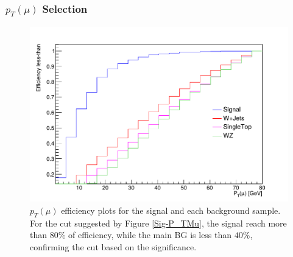 \documentclass{beamer}
\begin{document}
\begin{frame}
\frametitle{$p_T(\mu)$ Selection}
\begin{figure}[!h]
	
	\centering
	\includegraphics[scale=0.4]{pictures/Selection/P_TMu/Eff-P_TMu}
	\caption{{\scriptsize$p_T(\mu)$ efficiency plots for the signal and each background sample. For the cut suggested by Figure \ref{Sig-P_TMu}, the signal reach more than $80\%$ of efficiency, while the main BG is less than $40\%$, confirming the cut based on the significance.}}
	\label{Eff-P_TMu}
	
\end{figure}


\end{frame}

\end{document}
